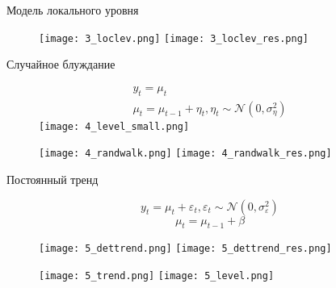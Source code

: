 \documentclass{beamer}
\begin{document}
\begin{frame}[fragile]
\begin{columns}[T]
\begin{column}{.32\textwidth}
\begin{block}{Модель локального уровня}
\begin{figure}[htb]
  \texttt{[image: 3\_loclev.png]}
\endminipage\hfill
{}
  \texttt{[image: 3\_loclev\_res.png]}
\endminipage\hfill
\end{figure}
\end{block}

\begin{block}{Случайное блуждание}

\vspace{-0.25cm}

\begin{figure}[htb]
\begin{gather*}
y_t = \mu_t
\\
\mu_t = \mu_{t-1} + \eta_t , \eta_t \sim \mathcal{N}(0, \sigma_\eta^2)
\end{gather*}
\endminipage \hfill
{}
\texttt{[image: 4\_level\_small.png]}
\endminipage\hfill
\end{figure}

\begin{figure}[htb]
  \texttt{[image: 4\_randwalk.png]}
\endminipage\hfill
{}
  \texttt{[image: 4\_randwalk\_res.png]}
\endminipage\hfill
\end{figure}
\end{block}

\begin{block}{Постоянный тренд}

\vspace{-0.5cm}

\[
y_t = \mu_t + \varepsilon_t, \varepsilon_t \sim \mathcal{N}(0, \sigma^2_\varepsilon)
\]
\[
\mu_t = \mu_{t-1} + \beta
\]

\begin{figure}[htb]
  \texttt{[image: 5\_dettrend.png]}
\endminipage\hfill
{}
  \texttt{[image: 5\_dettrend\_res.png]}
\endminipage\hfill
\end{figure}

\vspace{-0.25cm}

\begin{figure}[htb]
  \texttt{[image: 5\_trend.png]}
\endminipage\hfill
{}
  \texttt{[image: 5\_level.png]}
\endminipage\hfill
\end{figure}
\end{block}


\end{column}
\end{columns}
\end{frame}
\end{document}
